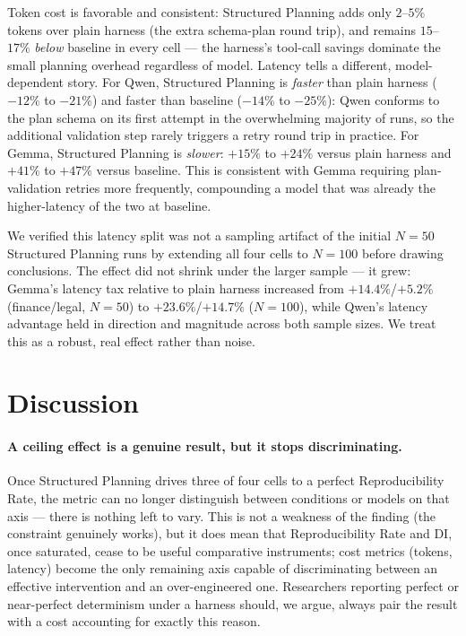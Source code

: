 \documentclass[11pt]{article}
\begin{document}
Token cost is favorable and consistent: Structured Planning adds only $2$--$5\%$ tokens over plain harness (the extra schema-plan round trip), and remains $15$--$17\%$ \emph{below} baseline in every cell --- the harness's tool-call savings dominate the small planning overhead regardless of model. Latency tells a different, model-dependent story. For Qwen, Structured Planning is \emph{faster} than plain harness ($-12\%$ to $-21\%$) and faster than baseline ($-14\%$ to $-25\%$): Qwen conforms to the plan schema on its first attempt in the overwhelming majority of runs, so the additional validation step rarely triggers a retry round trip in practice. For Gemma, Structured Planning is \emph{slower}: $+15\%$ to $+24\%$ versus plain harness and $+41\%$ to $+47\%$ versus baseline. This is consistent with Gemma requiring plan-validation retries more frequently, compounding a model that was already the higher-latency of the two at baseline.

We verified this latency split was not a sampling artifact of the initial $N=50$ Structured Planning runs by extending all four cells to $N=100$ before drawing conclusions. The effect did not shrink under the larger sample --- it grew: Gemma's latency tax relative to plain harness increased from $+14.4\%$/$+5.2\%$ (finance/legal, $N=50$) to $+23.6\%$/$+14.7\%$ ($N=100$), while Qwen's latency advantage held in direction and magnitude across both sample sizes. We treat this as a robust, real effect rather than noise.

\section{Discussion}

\paragraph{A ceiling effect is a genuine result, but it stops discriminating.} Once Structured Planning drives three of four cells to a perfect Reproducibility Rate, the metric can no longer distinguish between conditions or models on that axis --- there is nothing left to vary. This is not a weakness of the finding (the constraint genuinely works), but it does mean that Reproducibility Rate and DI, once saturated, cease to be useful comparative instruments; cost metrics (tokens, latency) become the only remaining axis capable of discriminating between an effective intervention and an over-engineered one. Researchers reporting perfect or near-perfect determinism under a harness should, we argue, always pair the result with a cost accounting for exactly this reason.
\end{document}
